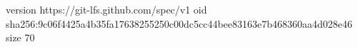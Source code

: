 version https://git-lfs.github.com/spec/v1
oid sha256:9c06f4425a4b35fa17638255250c00dc5cc44bee83163e7b468360aa4d028e46
size 70
